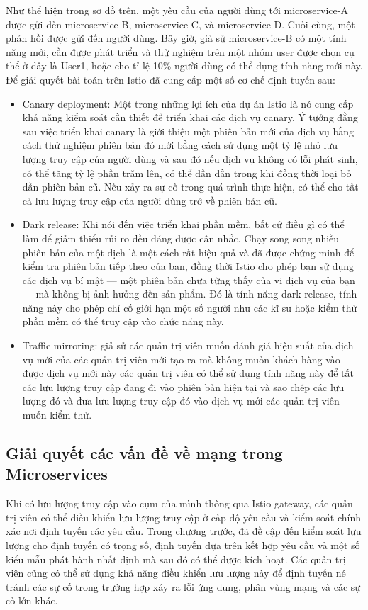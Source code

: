 \documentclass[12pt,a4paper]{report}
\begin{document}
			Như thể hiện trong sơ đồ trên, một yêu cầu của người dùng tới microservice-A được gửi đến microservice-B, microservice-C, và microservice-D. Cuối cùng, một phản hồi được gửi đến người dùng. Bây giờ, giả sử microservice-B có một tính năng mới, cần được phát triển và thử nghiệm trên một nhóm user được chọn cụ thể ở đây là User1, hoặc cho tỉ lệ 10\% người dùng có thể dụng tính năng mới này. 
			Để giải quyết bài toán trên Istio đã cung cấp một số cơ chế định tuyến sau:
			\begin{itemize}
				\item Canary deployment: Một trong những lợi ích của dự án Istio là nó cung cấp khả năng kiểm soát cần thiết để triển khai các dịch vụ canary. Ý tưởng đằng sau việc triển khai canary là giới thiệu một phiên bản mới của dịch vụ bằng cách thử nghiệm phiên bản đó mới bằng cách sử dụng một tỷ lệ nhỏ lưu lượng truy cập của người dùng và sau đó nếu dịch vụ không có lỗi phát sinh, có thể tăng tỷ lệ phần trăm lên, có thể dần dần trong khi đồng thời loại bỏ dần phiên bản cũ. Nếu xảy ra sự cố trong quá trình thực hiện, có thể cho tất cả lưu lượng truy cập của người dùng trở về phiên bản cũ.
				\item Dark release: Khi nói đến việc triển khai phần mềm, bất cứ điều gì có thể làm để giảm thiểu rủi ro đều đáng được cân nhắc. Chạy song song nhiều phiên bản của một dịch là một cách rất hiệu quả và đã được chứng minh để kiểm tra phiên bản tiếp theo của bạn, đồng thời Istio cho phép bạn sử dụng các dịch vụ bí mật — một phiên bản chưa từng thấy của vi dịch vụ của bạn — mà không bị ảnh hưởng đến sản phẩm. Đó là tính năng dark release, tính năng này cho phép chỉ cố giới hạn một số người như các kĩ sư hoặc kiểm thử phần mềm có thể truy cập vào chức năng này.
				\item Traffic mirroring: giả sử các quản trị viên muốn đánh giá hiệu suất của dịch vụ mới của các quản trị viên mới tạo ra mà không muốn khách hàng vào được dịch vụ mới này các quản trị viên có thể sử dụng tính năng này để tất các lưu lượng truy cập đang đi vào phiên bản hiện tại và sao chép các lưu lượng đó và đưa lưu lượng truy cập đó vào dịch vụ mới các quản trị viên muốn kiểm thử.
			\end{itemize}
			
			
		\subsection{Giải quyết các vấn đề về mạng trong Microservices}
\hspace{0.6cm}Khi có lưu lượng truy cập vào cụm của mình thông qua Istio gateway, các quản trị viên có thể điều khiển lưu lượng truy cập ở cấp độ yêu cầu và kiểm soát chính xác nơi định tuyến các yêu cầu. Trong chương trước, đã đề cập đến kiểm soát lưu lượng cho định tuyến có trọng số, định tuyến dựa trên kết hợp yêu cầu và một số kiểu mẫu phát hành nhất định mà sau đó có thể được kích hoạt. Các quản trị viên cũng có thể sử dụng khả năng điều khiển lưu lượng này để định tuyến né tránh các sự cố trong trường hợp xảy ra lỗi ứng dụng, phân vùng mạng và các sự cố lớn khác.
\end{document}
